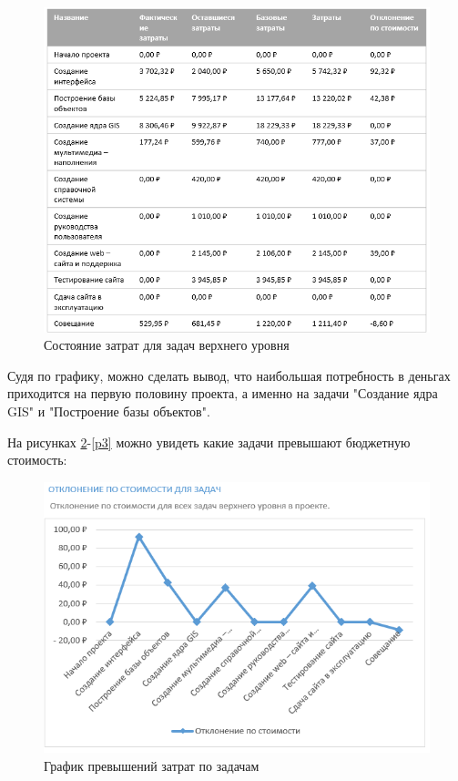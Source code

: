 \newpage
\begin{figure}[!h]
	\centering
	\includegraphics[width=0.7\linewidth]{inc/img/5.png}
	\caption{Состояние затрат для задач верхнего уровня}
	\label{p5}
\end{figure}

Судя по графику, можно сделать вывод, что наибольшая потребность в деньгах приходится на первую половину проекта, а именно на задачи "Создание ядра GIS" и "Построение базы объектов".

На рисунках \ref{p2}-\ref{p3} можно увидеть какие задачи превышают бюджетную стоимость:
\begin{figure}[!h]
	\centering
	\includegraphics[width=0.7\linewidth]{inc/img/2.png}
	\caption{График превышений затрат по задачам}
	\label{p2}
\end{figure}

